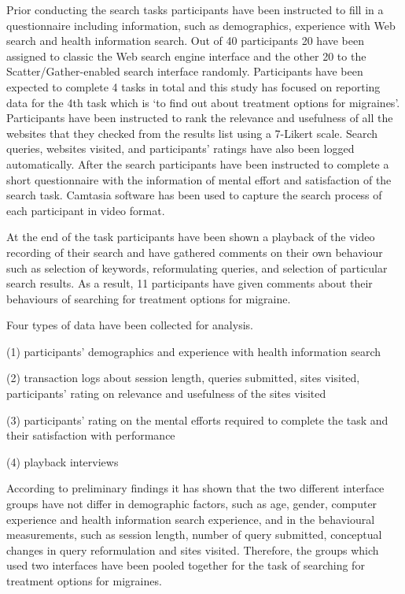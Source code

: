 \documentclass[]{article}
\begin{document}
Prior conducting the search tasks participants have been instructed to fill in a questionnaire including information, such as demographics, experience with Web search and health information search. Out of 40 participants 20 have been assigned to classic the Web search engine interface and the other 20 to the Scatter/Gather-enabled search interface randomly. Participants have been expected to complete 4 tasks in total and this study has focused on reporting data for the 4th task which is ‘to find out about treatment options for migraines’. Participants have been instructed to rank the relevance and usefulness of all the websites that they checked from the results list using a 7-Likert scale. Search queries, websites visited, and participants’ ratings have also been logged automatically. After the search participants have been instructed to complete a short questionnaire with the information of mental effort and satisfaction of the search task. Camtasia software has been used to capture the search process of each participant in video format.   
     
At the end of the task participants have been shown a playback of the video recording of their search and have gathered comments on their own behaviour such as selection of keywords, reformulating queries, and selection of particular search results. As a result, 11 participants have given comments about their behaviours of searching for treatment options for migraine.   
  
Four types of data have been collected for analysis.

(1) participants’ demographics and experience with health information search

(2) transaction logs about session length, queries submitted, sites visited, participants’ rating on relevance and usefulness of the sites visited

(3) participants’ rating on the mental efforts required to complete the task and their satisfaction with performance

(4) playback interviews

According to preliminary findings it has shown that the two different interface groups have not differ in demographic factors, such as age, gender, computer experience and health information search experience, and in the behavioural measurements, such as session length, number of query submitted, conceptual changes in query reformulation and sites visited. Therefore, the groups which used two interfaces have been pooled together for the task of searching for treatment options for migraines. 
\end{document}
